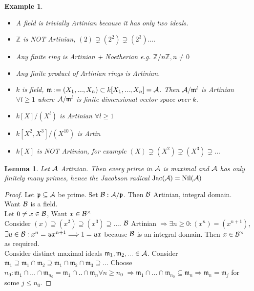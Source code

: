 \documentclass[11pt]{article}
\newtheorem{lemma}[thm]{Lemma}
\newtheorem{ex}[thm]{Example}
\newcommand{\intg}{\mathbb Z}
\newcommand{\scm}{{\mathfrak m}}
\newcommand{\scp}{{\mathfrak p}}
\newcommand{\cala}{{\cal A}}
\newcommand{\calb}{{\cal B}}
\newcommand{\Lrta}{\Longrightarrow}
\begin{document}
\begin{ex}\ 
\begin{itemize}
\item A field is trivially Artinian   because it has only two ideals.
\item $\intg $ is NOT Artinian,
$(2)\supsetneq (2^2)\supsetneq (2^3)....$
\item Any finite ring is Artinian   + Noetherian e.g. $\intg/n\intg,n\neq 0$
\item Any finite product of Artinian  rings is Artinian. 
\item $k$ is field, $\scm:=(X_1,...,X_n)\subset k[X_1,...,X_n]=\cala$. Then $\cala/\scm^l$ is Artinian   $\forall l\geq 1$ where $\cala/\scm^l$ is finite dimensional vector space over $k$.
\item $k[X]/(X^l)$ is Artinian   $\forall l\geq 1$
\item $k[X^2,X^3]/(X^{10})$ is Artin
\item $k[X]$ is NOT Artinian, for example $(X)\supsetneq (X^2)\supsetneq (X^3)\supsetneq ...$
\end{itemize}
\end{ex}

\begin{lemma}\label{lem:primes_are_maximal_in_Artin}
Let $\cala$ Artinian.  Then every prime in $\cala$ is maximal and $\cala$ has only finitely many primes, hence the Jacobson radical $\text{Jac}(\cala)=\text{Nil}(  \cala)$
\end{lemma}
\begin{proof}
Let $\scp\subseteq \cala$ be prime. Set $\calb:\cala/\scp$. Then $\calb$ Artinian, integral domain.
\\
Want $\calb$ is a field.\\
Let $0\neq x\in \calb$, Want $x\in \calb^\times$\\
Consider $(x)\supseteq (x^2)\supseteq (x^3)\supseteq...$. $\calb$ Artinian   $\Lrta \exists n\geq 0: (x^n)=(x^{n+1})$, $\exists u\in \calb:x^n=u x^{n+1}\Lrta 1=ux$ because $\calb$ is an integral domain. Then $x\in\calb^{\times}$ as required.\\
Consider distinct maximal ideals $\scm_1,\scm_2,...\in\cala$. Consider $\scm_1\supseteq \scm_1\cap \scm_2\supseteq \scm_1\cap\scm_2\cap \scm_3\supseteq ...$ Choose $n_0: \scm_1\cap...\cap \scm_{n_0}=\scm_1\cap..\cap\scm_n \forall n\geq n_0$ $\Lrta \scm_1\cap...\cap\scm_{n_0}\subseteq \scm_n\Lrta \scm_n=\scm_j$ for some $j\leq n_0$.
\end{proof}
\end{document}

